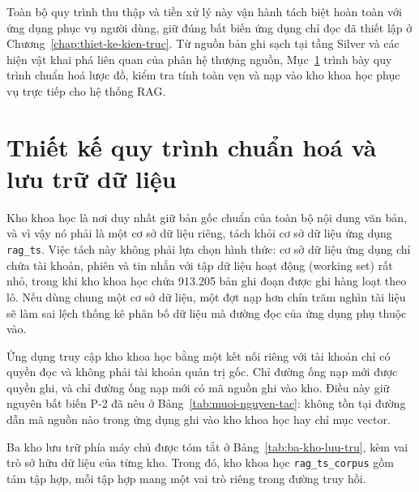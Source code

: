 Toàn bộ quy trình thu thập và tiền xử lý này vận hành tách biệt hoàn toàn với ứng dụng phục vụ người dùng, giữ đúng bất biến ứng dụng chỉ đọc đã thiết lập ở Chương~\ref{chap:thiet-ke-kien-truc}. Từ nguồn bản ghi sạch tại tầng Silver và các hiện vật khai phá liên quan của phân hệ thượng nguồn, Mục~\ref{sec:chuan-hoa-luu-tru} trình bày quy trình chuẩn hoá lược đồ, kiểm tra tính toàn vẹn và nạp vào kho khoa học phục vụ trực tiếp cho hệ thống RAG.

\section{Thiết kế quy trình chuẩn hoá và lưu trữ dữ liệu}
\label{sec:chuan-hoa-luu-tru}

Kho khoa học là nơi duy nhất giữ bản gốc chuẩn của toàn bộ nội dung văn bản, và vì vậy nó phải là một cơ sở dữ liệu riêng, tách khỏi cơ sở dữ liệu ứng dụng \texttt{rag\_ts}. Việc tách này không phải lựa chọn hình thức: cơ sở dữ liệu ứng dụng chỉ chứa tài khoản, phiên và tin nhắn với tập dữ liệu hoạt động (working set) rất nhỏ, trong khi kho khoa học chứa 913.205 bản ghi đoạn được ghi hàng loạt theo lô. Nếu dùng chung một cơ sở dữ liệu, một đợt nạp hơn chín trăm nghìn tài liệu sẽ làm sai lệch thống kê phân bố dữ liệu mà đường đọc của ứng dụng phụ thuộc vào.

Ứng dụng truy cập kho khoa học bằng một kết nối riêng với tài khoản chỉ có quyền đọc và không phải tài khoản quản trị gốc. Chỉ đường ống nạp mới được quyền ghi, và chỉ đường ống nạp mới có mã nguồn ghi vào kho. Điều này giữ nguyên bất biến P-2 đã nêu ở Bảng~\ref{tab:muoi-nguyen-tac}: không tồn tại đường dẫn mã nguồn nào trong ứng dụng ghi vào kho khoa học hay chỉ mục vector.

Ba kho lưu trữ phía máy chủ được tóm tắt ở Bảng~\ref{tab:ba-kho-luu-tru}, kèm vai trò sở hữu dữ liệu của từng kho. Trong đó, kho khoa học \texttt{rag\_ts\_corpus} gồm tám tập hợp, mỗi tập hợp mang một vai trò riêng trong đường truy hồi.

